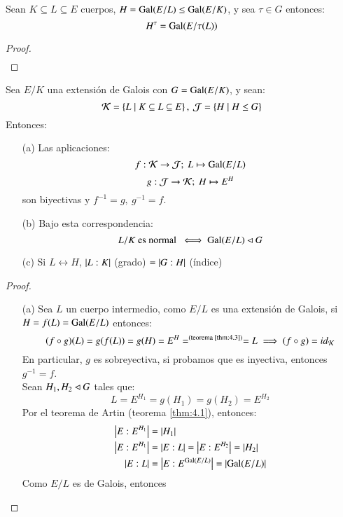\begin{lm}[Lema]\label{lm:4.5} %
    Sean $K \subseteq L \subseteq E$ cuerpos, $H = \mathrm{Gal}(E/L) \leq \mathrm{Gal}(E/K)$, y sea $\tau \in G$ entonces:
    $$
        H^\tau = \mathrm{Gal}(E/\tau(L))
    $$
\end{lm}
\begin{proof}$ $
    \begin{align*}
    \end{align*}
\end{proof}


\begin{thm}\label{thm:fund-gal}\label{thm:4.6}
    Sea $E/K$ una extensión de Galois con $G = \mathrm{Gal}(E/K)$, y sean:
    $$
        \mathcal{K} = \left\{L \mid K \subseteq L \subseteq E\right\},\ \mathcal{J} = \left\{H \mid H \leq G\right\}
    $$
    Entonces:
    \begin{itemize}
        \item[(a)] Las aplicaciones:
        $$ f: \mathcal{K} \to \mathcal{J};\ L \mapsto \mathrm{Gal}(E/L)$$
        $$ g: \mtc{J} \to \mtc{K};\ H \mapsto E^H $$
        son biyectivas y $f^{-1} = g,\ g^{-1} = f$.
        \item[(b)] Bajo esta correspondencia:
        $$
            L/K \text{ es normal } \iff \mathrm{Gal}(E/L) \lhd G
        $$
        \item[(c)] Si $L \longleftrightarrow H$, $\left|L:K\right|$ (grado) $ = \left|G:H\right|$ (índice)
    \end{itemize}
\end{thm}
\begin{proof}$ $
    \begin{itemize}
        \item[(a)] Sea $L$ un cuerpo intermedio, como $E/L$ es una extensión de Galois, si $H = f(L) = \mathrm{Gal}(E/L)$ entonces:
        $$
            (f \circ g)(L) = g(f(L)) = g(H) = E^H =^{\text{(teorema \ref{thm:4.3})}} = L \implies (f \circ g) = id_{\mathcal{K}}
        $$
        En particular, $g$ es sobreyectiva, si probamos que es inyectiva, entonces $g^{-1} = f$.\\
        Sean $H_1, H_2 \lhd G$ tales que:
        $$
            L = E^{H_1} = g(H_1) = g(H_2) = E^{H_2}
        $$
        Por el teorema de Artin (teorema \ref{thm:4.1}), entonces:
        \begin{align*}
            \left|E:E^{H_1}\right| &= \left|H_1\right|\\
            \left|E:E^{H_1}\right| &= \left|E:L\right| = \left|E:E^{H_2}\right| = \left|H_2\right|\\
            \left|E:L\right| &= \left|E:E^{\mathrm{Gal}(E/L)}\right| = \left|\mathrm{Gal}(E/L)\right|
        \end{align*}
        Como $E/L$ es de Galois, entonces
    \end{itemize}
\end{proof}

